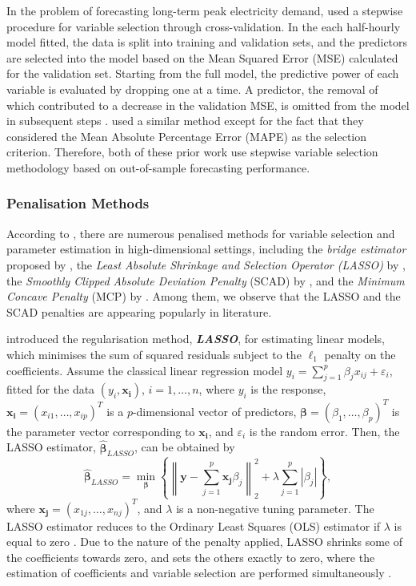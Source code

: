 \documentclass[11pt,a4paper,]{article}
\begin{document}
In the problem of forecasting long-term peak electricity demand,
\textcite{HF2010} used a stepwise procedure for variable selection
through cross-validation. In the each half-hourly model fitted, the data
is split into training and validation sets, and the predictors are
selected into the model based on the Mean Squared Error (MSE) calculated
for the validation set. Starting from the full model, the predictive
power of each variable is evaluated by dropping one at a time. A
predictor, the removal of which contributed to a decrease in the
validation MSE, is omitted from the model in subsequent steps
\autocite{HF2010}. \textcite{FH2012} used a similar method except for
the fact that they considered the Mean Absolute Percentage Error (MAPE)
as the selection criterion. Therefore, both of these prior work use
stepwise variable selection methodology based on out-of-sample
forecasting performance.

\hypertarget{penalisation-methods}{%
\subsubsection{Penalisation Methods}\label{penalisation-methods}}

According to \textcite{Huang2010}, there are numerous penalised methods
for variable selection and parameter estimation in high-dimensional
settings, including the \emph{bridge estimator} proposed by
\textcite{Frank1993}, the \emph{Least Absolute Shrinkage and Selection
Operator (LASSO)} by \textcite{Tibshirani1996}, the \emph{Smoothly
Clipped Absolute Deviation Penalty} (SCAD) by \textcite{Fan2001}, and
the \emph{Minimum Concave Penalty} (MCP) by \textcite{Zhang2010}. Among
them, we observe that the LASSO and the SCAD penalties are appearing
popularly in literature.

\textcite{Tibshirani1996} introduced the regularisation method,
\textbf{\emph{LASSO}}, for estimating linear models, which minimises the
sum of squared residuals subject to the \(\ell_{1}\) penalty on the
coefficients. Assume the classical linear regression model
\(y_{i} = \sum_{j=1}^{p} {\beta_{j}x_{ij}} +\varepsilon_{i}\), fitted
for the data \((y_{i}, \bm{x_{i}})\), \(i = 1, \dots, n\), where
\(y_{i}\) is the response, \(\bm{x_{i}} = (x_{i1}, \dots, x_{ip})^T\) is
a \(p\)-dimensional vector of predictors,
\(\bm{\beta} = (\beta_{1}, \dots, \beta_{p})^{T}\) is the parameter
vector corresponding to \(\bm{x_{i}}\), and \(\varepsilon_{i}\) is the
random error. Then, the LASSO estimator, \(\bm{\hat{\beta}}_{LASSO}\),
can be obtained by \[
 \bm{\hat{\beta}}_{LASSO} = \min_{\bm{\beta}}\left\{\left\lVert\bm{y} - \sum_{j=1}^{p} {\bm{x_{j}}\beta_{j}}\right\rVert_{2}^{2} + \lambda\sum_{j=1}^{p} {|\beta_{j}|}\right\},
\] where \(\bm{x_{j}} = \left (x_{1j}, \dots, x_{nj}\right )^{T}\), and
\(\lambda\) is a non-negative tuning parameter. The LASSO estimator
reduces to the Ordinary Least Squares (OLS) estimator if \(\lambda\) is
equal to zero \autocite{Konzen2016}. Due to the nature of the penalty
applied, LASSO shrinks some of the coefficients towards zero, and sets
the others exactly to zero, where the estimation of coefficients and
variable selection are performed simultaneously \autocite{Konzen2016}.
\end{document}
